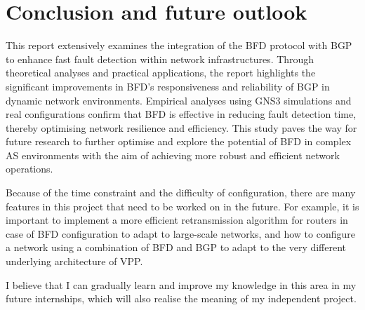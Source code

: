 \documentclass[12pt]{article}
\begin{document}
\newpage
\section{Conclusion and future outlook}
This report extensively examines the integration of the BFD protocol with BGP to enhance fast fault detection within network infrastructures. Through theoretical analyses and practical applications, the report highlights the significant improvements in BFD's responsiveness and reliability of BGP in dynamic network environments. Empirical analyses using GNS3 simulations and real configurations confirm that BFD is effective in reducing fault detection time, thereby optimising network resilience and efficiency. This study paves the way for future research to further optimise and explore the potential of BFD in complex AS environments with the aim of achieving more robust and efficient network operations.

Because of the time constraint and the difficulty of configuration, there are many features in this project that need to be worked on in the future. For example, it is important to implement a more efficient retransmission algorithm for routers in case of BFD configuration to adapt to large-scale networks, and how to configure a network using a combination of BFD and BGP to adapt to the very different underlying architecture of VPP.

I believe that I can gradually learn and improve my knowledge in this area in my future internships, which will also realise the meaning of my independent project.
\end{document}
